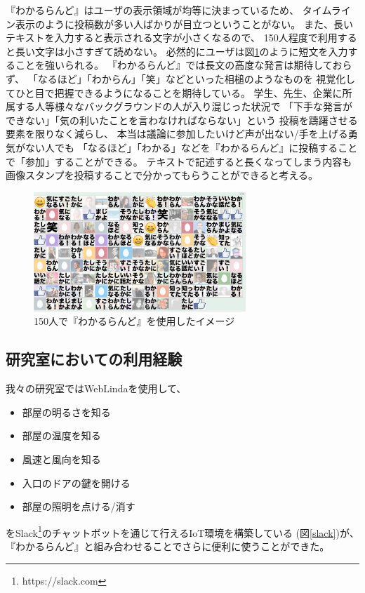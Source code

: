『わかるらんど』はユーザの表示領域が均等に決まっているため、
タイムライン表示のように投稿数が多い人ばかりが目立つということがない。
また、長いテキストを入力すると表示される文字が小さくなるので、
150人程度で利用すると長い文字は小さすぎて読めない。
必然的にユーザは図\ref{wakaruland150}のように短文を入力することを強いられる。
『わかるらんど』では長文の高度な発言は期待しておらず、
「なるほど」「わからん」「笑」などといった相槌のようなものを
視覚化してひと目で把握できるようになることを期待している。
学生、先生、企業に所属する人等様々なバックグラウンドの人が入り混じった状況で
「下手な発言ができない」「気の利いたことを言わなければならない」という
投稿を躊躇させる要素を限りなく減らし、
本当は議論に参加したいけど声が出ない/手を上げる勇気がない人でも
「なるほど」「わかる」などを『わかるらんど』に投稿することで「参加」することができる。
テキストで記述すると長くなってしまう内容も
画像スタンプを投稿することで分かってもらうことができると考える。


\begin{figure}[h]
\centering
\includegraphics[width=8cm]{images/wakaruland150.png}
\caption{150人で『わかるらんど』を使用したイメージ}
\label{wakaruland150}
\end{figure}

\subsection{研究室においての利用経験}
我々の研究室ではWebLindaを使用して、
\begin{itemize}
\item 部屋の明るさを知る
\item 部屋の温度を知る
\item 風速と風向を知る
\item 入口のドアの鍵を開ける
\item 部屋の照明を点ける/消す
\end{itemize}
をSlack\footnote{https://slack.com}のチャットボットを通じて行えるIoT環境を構築している
(図\ref{slack})が、『わかるらんど』と組み合わせることでさらに便利に使うことができた。


